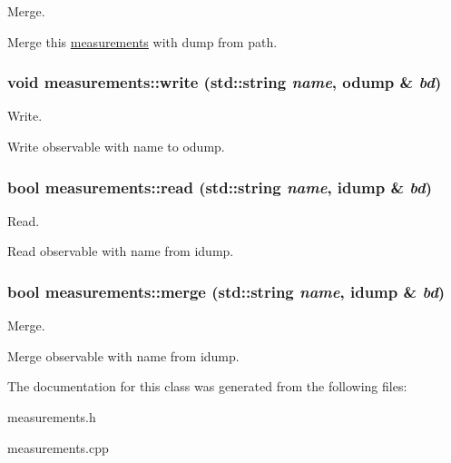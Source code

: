 Merge. 

Merge this \hyperlink{classmeasurements}{measurements} with dump from path. \hypertarget{classmeasurements_035e31e9821c0e4d6dbe853c5d813bd7}{
\subsubsection[write]{\setlength{\rightskip}{0pt plus 5cm}void measurements::write (std::string {\em name}, \/  odump \& {\em bd})}}
\label{classmeasurements_035e31e9821c0e4d6dbe853c5d813bd7}


Write. 

Write observable with name to odump. \hypertarget{classmeasurements_d50ae0faa7d3a20190bb49cfdad450cc}{
\subsubsection[read]{\setlength{\rightskip}{0pt plus 5cm}bool measurements::read (std::string {\em name}, \/  idump \& {\em bd})}}
\label{classmeasurements_d50ae0faa7d3a20190bb49cfdad450cc}


Read. 

Read observable with name from idump. \hypertarget{classmeasurements_43b7fecf4ea146bbe9e9941dbb80e914}{
\subsubsection[merge]{\setlength{\rightskip}{0pt plus 5cm}bool measurements::merge (std::string {\em name}, \/  idump \& {\em bd})}}
\label{classmeasurements_43b7fecf4ea146bbe9e9941dbb80e914}


Merge. 

Merge observable with name from idump. 

The documentation for this class was generated from the following files:\begin{CompactItemize}
\item 
measurements.h\item 
measurements.cpp\end{CompactItemize}
